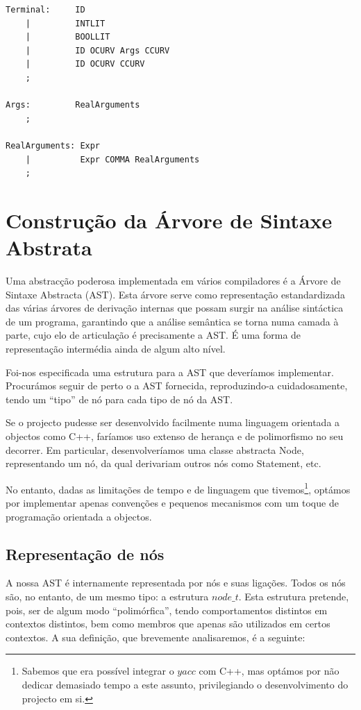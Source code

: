\documentclass[11pt,a4paper]{article}
\begin{document}
\begin{lstlisting}
Terminal:     ID
    |         INTLIT
    |         BOOLLIT
    |         ID OCURV Args CCURV
    |         ID OCURV CCURV
    ;

Args:         RealArguments
    ;

RealArguments: Expr
    |          Expr COMMA RealArguments
    ;
\end{lstlisting}

\pagebreak

\section{Construção da Árvore de Sintaxe Abstrata}

Uma abstracção poderosa implementada em vários compiladores é a Árvore de Sintaxe Abstracta (AST). Esta árvore serve como representação estandardizada das várias árvores de derivação internas que possam surgir na análise sintáctica de um programa, garantindo que a análise semântica se torna numa camada à parte, cujo elo de articulação é precisamente a AST. É uma forma de representação intermédia ainda de algum alto nível.

Foi-nos especificada uma estrutura para a AST que deveríamos implementar. Procurámos seguir de perto o a AST fornecida, reproduzindo-a cuidadosamente, tendo um ``tipo'' de nó para cada tipo de nó da AST.

Se o projecto pudesse ser desenvolvido facilmente numa linguagem orientada a objectos como C++, faríamos uso extenso de herança e de polimorfismo no seu decorrer. Em particular, desenvolveríamos uma classe abstracta Node, representando um nó, da qual derivariam outros nós como Statement, etc.

No entanto, dadas as limitações de tempo e de linguagem que tivemos\footnote{Sabemos que era possível integrar o $yacc$ com C++, mas optámos por não dedicar demasiado tempo a este assunto, privilegiando o desenvolvimento do projecto em si. }, optámos por implementar apenas convenções e pequenos mecanismos com um toque de programação orientada a objectos.

\subsection{Representação de nós}

A nossa AST é internamente representada por nós e suas ligações. Todos os nós são, no entanto, de um mesmo tipo: a estrutura $node\_t$. Esta estrutura pretende, pois, ser de algum modo ``polimórfica'', tendo comportamentos distintos em contextos distintos, bem como membros que apenas são utilizados em certos contextos. A sua definição, que brevemente analisaremos, é a seguinte:
\end{document}
